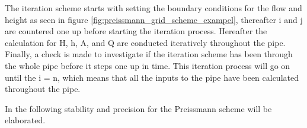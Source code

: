 The iteration scheme starts with setting the boundary conditions for the flow and height as seen in figure \ref{fig:preissmann_grid_scheme_exampel}, thereafter i and j are countered one up before starting the iteration process. Hereafter the calculation for H, h, A, and Q are conducted iteratively throughout the pipe. Finally, a check is made to investigate if the iteration scheme has been through the whole pipe before it steps one up in time. This iteration process will go on until the i = n, which means that all the inputs to the pipe have been calculated throughout the pipe.   

In the following stability and precision for the Preissmann scheme will be elaborated. %


